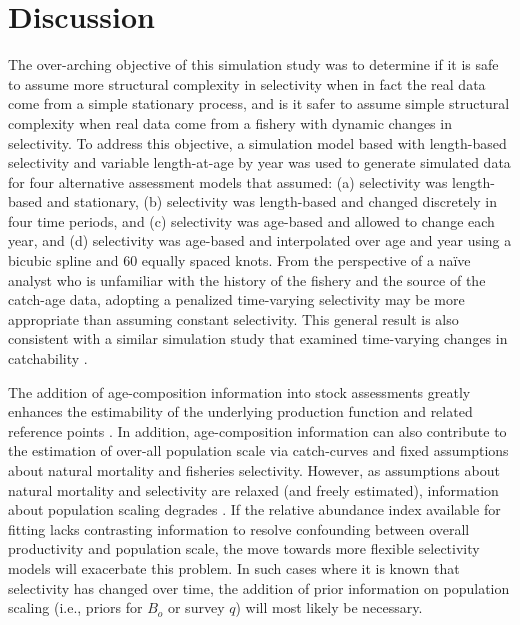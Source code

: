 \section*{Discussion} %
\label{sec:discussion}

The over-arching objective of this simulation study was to determine if it is safe to assume more structural complexity in selectivity when in fact the real data come from a simple stationary process, and is it safer to assume simple structural complexity when real data come from a fishery with dynamic changes in selectivity.  To address this objective, a simulation model based with length-based selectivity and variable length-at-age by year was used to generate simulated data for four alternative assessment models that assumed: (a) selectivity was length-based and stationary, (b) selectivity was length-based and changed discretely in four time periods, and (c) selectivity was age-based and allowed to change each year, and (d) selectivity was age-based and interpolated over age and year using a bicubic spline and 60 equally spaced knots.  From the perspective of a na\"ive analyst who is unfamiliar with the history of the fishery and the source of the catch-age data, adopting a penalized time-varying selectivity may be more appropriate than assuming constant selectivity.  This general result is also consistent with a similar simulation study that examined time-varying changes in catchability \citep{wilberg2006performance}.

The addition of age-composition information into stock assessments greatly enhances the estimability of the underlying production function and related reference points \citep{magnusson2007mfd}.  In addition, age-composition information can also contribute to the estimation of over-all population scale via catch-curves and fixed assumptions about natural mortality and fisheries selectivity.  However, as assumptions about natural mortality and selectivity are relaxed (and freely estimated), information about population scaling degrades \citep{hilborn1992quantitative}. If the relative abundance index available for fitting lacks contrasting information to resolve confounding between overall productivity and population scale, the move towards more flexible selectivity models will exacerbate this problem.  In such cases where it is known that selectivity has changed over time, the addition of prior information on population scaling (i.e., priors for $B_o$ or survey $q$) will most likely be necessary. 

